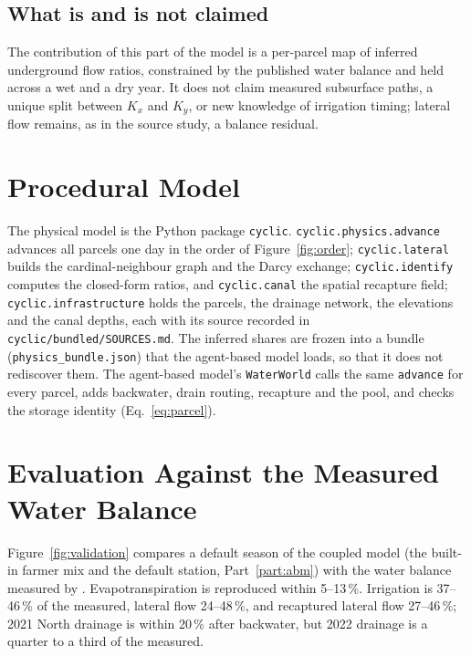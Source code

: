 \documentclass[11pt]{article}
\begin{document}
\subsection{What is and is not claimed}
The contribution of this part of the model is a per-parcel map of inferred underground flow ratios, constrained by the published water balance and held across a wet and a dry year. It does not claim measured subsurface paths, a unique split between $K_x$ and $K_y$, or new knowledge of irrigation timing; lateral flow remains, as in the source study, a balance residual.

\section{Procedural Model}
\label{sec:procedural}

The physical model is the Python package \texttt{cyclic}. \texttt{cyclic.physics.advance} advances all parcels one day in the order of Figure~\ref{fig:order}; \texttt{cyclic.lateral} builds the cardinal-neighbour graph and the Darcy exchange; \texttt{cyclic.identify} computes the closed-form ratios, and \texttt{cyclic.canal} the spatial recapture field; \texttt{cyclic.infrastructure} holds the parcels, the drainage network, the elevations and the canal depths, each with its source recorded in \texttt{cyclic/bundled/SOURCES.md}. The inferred shares are frozen into a bundle (\texttt{physics\_bundle.json}) that the agent-based model loads, so that it does not rediscover them. The agent-based model's \texttt{WaterWorld} calls the same \texttt{advance} for every parcel, adds backwater, drain routing, recapture and the pool, and checks the storage identity (Eq.~\ref{eq:parcel}).

\section{Evaluation Against the Measured Water Balance}
\label{sec:evaluation}

Figure~\ref{fig:validation} compares a default season of the coupled model (the built-in farmer mix and the default station, Part~\ref{part:abm}) with the water balance measured by \citet{Okura2025WaterBalance}. Evapotranspiration is reproduced within 5--13\,\%. Irrigation is 37--46\,\% of the measured, lateral flow 24--48\,\%, and recaptured lateral flow 27--46\,\%; 2021 North drainage is within 20\,\% after backwater, but 2022 drainage is a quarter to a third of the measured.
\end{document}
